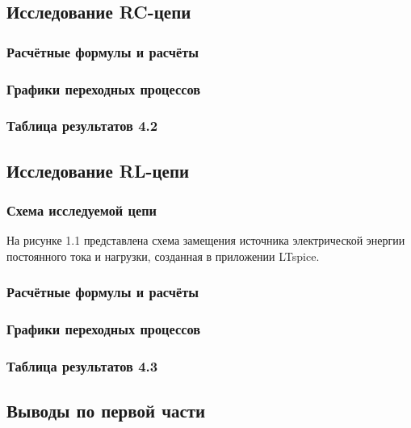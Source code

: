 \subsection{Исследование RC-цепи}




\subsubsection{Расчётные формулы и расчёты}

\subsubsection{Графики переходных процессов}

\subsubsection{Таблица результатов 4.2}

\subsection{Исследование RL-цепи}

\subsubsection{Схема исследуемой цепи}
На рисунке 1.1 представлена схема замещения источника электрической энергии постоянного тока и нагрузки, созданная в приложении LTspice.


\subsubsection{Расчётные формулы и расчёты}

\subsubsection{Графики переходных процессов}

\subsubsection{Таблица результатов 4.3}

\subsection{Выводы по первой части}
